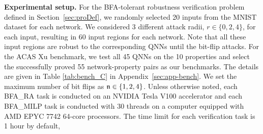 
         
         

         
        


\smallskip
\noindent
{\bf Experimental setup.} For the BFA-tolerant robustness verification problem defined in Section~\ref{sec:proDef}, we randomly selected 20 inputs from the MNIST dataset for each network. We considered 3 different attack radii, $r\in\{0,2,4\}$, for each input, resulting in 60 input regions for each network. Note that all these input regions are robust to the corresponding QNNs until the bit-flip attacks.
For the ACAS Xu benchmark, we test all 45 QNNs on the 10 properties and select the successfully proved 55 network-property pairs as our benchmarks. The details are given in Table \ref{tab:bench_C} in Appendix~\ref{sec:app-bench}.
We set the maximum number of bit flips as $\mathfrak{n}\in \{1,2,4\}$. 
% 
Unless otherwise noted, each BFA\_RA task is conducted on an NVIDIA Tesla V100 accelerator and each BFA\_MILP task is conducted with 30 threads on a computer equipped with AMD EPYC 7742 64-core processors. The time limit for each verification task is 1 hour by default, 



